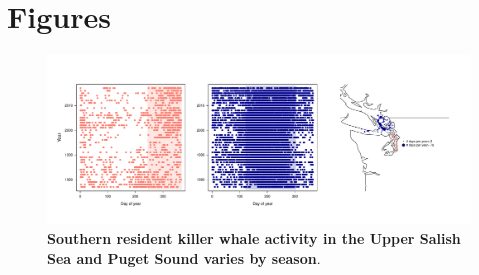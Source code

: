 \documentclass{article}
\begin{document}



\section* {Figures}

\begin{figure}[h!]
\includegraphics{../analyses/figures/OrcaPhenPlots/srkw_phenmap_assumeSRKW.pdf} 
\caption{\textbf{Southern resident killer whale activity in the Upper Salish Sea and Puget Sound varies by season}. }
 \label{fig:phenplot}
 \end{figure}
 

 
\end{document}

